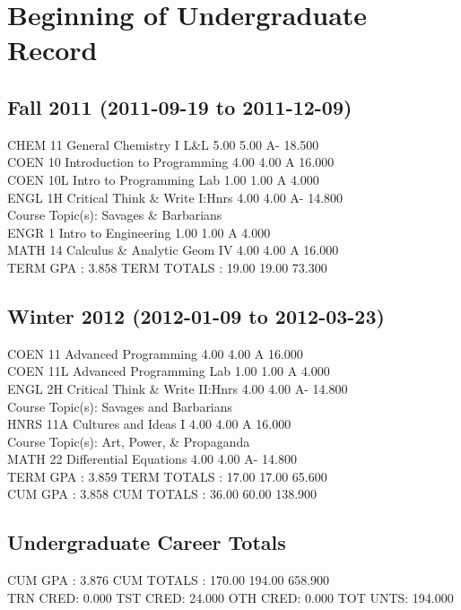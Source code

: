 \documentclass[paper=letter, fontsize=11pt]{scrartcl} %
\begin{document}
\section{Beginning of Undergraduate Record}

\subsection{Fall 2011  (2011-09-19 to 2011-12-09)}
CHEM       11       General Chemistry I L\&L           5.00     5.00 A-      18.500\\
COEN       10       Introduction to Programming       4.00     4.00 A       16.000\\
COEN       10L      Intro to Programming Lab          1.00     1.00 A        4.000\\
ENGL        1H      Critical Think \& Write I:Hnrs     4.00     4.00 A-      14.800\\
     Course Topic(s): Savages \& Barbarians\\
ENGR        1       Intro to Engineering              1.00     1.00 A        4.000\\
MATH       14       Calculus \& Analytic Geom IV       4.00     4.00 A       16.000\\
         TERM GPA :     3.858      TERM TOTALS :     19.00    19.00         73.300\\
	
\subsection{Winter 2012  (2012-01-09 to 2012-03-23)}
COEN       11       Advanced Programming              4.00     4.00 A       16.000\\
COEN       11L      Advanced Programming Lab          1.00     1.00 A        4.000\\
ENGL        2H      Critical Think \& Write II:Hnrs    4.00     4.00 A-      14.800\\
     Course Topic(s): Savages and Barbarians\\
HNRS       11A      Cultures and Ideas I              4.00     4.00 A       16.000\\
     Course Topic(s): Art, Power, \& Propaganda\\
MATH       22       Differential Equations            4.00     4.00 A-      14.800\\
         TERM GPA :     3.859      TERM TOTALS :     17.00    17.00         65.600\\
         CUM  GPA :     3.858      CUM  TOTALS :     36.00    60.00        138.900\\

 \subsection{Undergraduate Career Totals}
CUM GPA : 3.876 CUM TOTALS : 170.00 194.00 658.900\\
TRN CRED: 0.000 TST CRED: 24.000 OTH CRED: 0.000 TOT UNTS: 194.000\\
\end{document}
